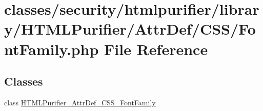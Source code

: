 \hypertarget{FontFamily_8php}{\section{classes/security/htmlpurifier/library/\+H\+T\+M\+L\+Purifier/\+Attr\+Def/\+C\+S\+S/\+Font\+Family.php File Reference}
\label{FontFamily_8php}
}
\subsection*{Classes}
\begin{DoxyCompactItemize}
\item 
class \hyperlink{classHTMLPurifier__AttrDef__CSS__FontFamily}{H\+T\+M\+L\+Purifier\+\_\+\+Attr\+Def\+\_\+\+C\+S\+S\+\_\+\+Font\+Family}
\end{DoxyCompactItemize}
